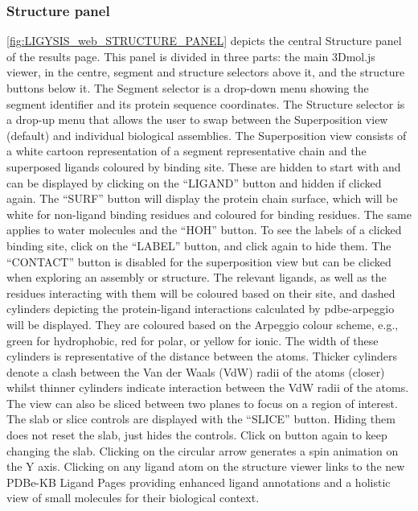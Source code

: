 \subsubsection{Structure panel}

\autoref{fig:LIGYSIS_web_STRUCTURE_PANEL} depicts the central Structure panel of the results page. This panel is divided in three parts: the main 3Dmol.js viewer, in the centre, segment and structure selectors above it, and the structure buttons below it. The Segment selector  is a drop-down menu showing the segment identifier and its protein sequence coordinates. The Structure selector is a drop-up menu that allows the user to swap between the Superposition view (default) and individual biological assemblies. The Superposition view consists of a white cartoon representation of a segment representative chain and the superposed ligands coloured by binding site. These are hidden to start with and can be displayed by clicking on the ``LIGAND'' button and hidden if clicked again. The ``SURF'' button will display the protein chain surface, which will be white for non-ligand binding residues and coloured for binding residues. The same applies to water molecules and the ``HOH'' button. To see the labels of a clicked binding site, click on the ``LABEL'' button, and click again to hide them. The ``CONTACT'' button is disabled for the superposition view but can be clicked when exploring an assembly or structure. The relevant ligands, as well as the residues interacting with them will be coloured based on their site, and dashed cylinders depicting the protein-ligand interactions calculated by pdbe-arpeggio will be displayed. They are coloured based on the Arpeggio colour scheme, e.g., green for hydrophobic, red for polar, or yellow for ionic. The width of these cylinders is representative of the distance between the atoms. Thicker cylinders denote a clash between the Van der Waals (VdW) radii of the atoms (closer) whilst thinner cylinders indicate interaction between the VdW radii of the atoms. The view can also be sliced between two planes to focus on a region of interest. The slab or slice controls are displayed with the ``SLICE'' button. Hiding them does not reset the slab, just hides the controls. Click on button again to keep changing the slab. Clicking on the circular arrow generates a spin animation on the Y axis. Clicking on any ligand atom on the structure viewer links to the new PDBe-KB Ligand Pages \cite{CHOUDHARY_2024_PDBETOOLS} providing enhanced ligand annotations and a holistic view of small molecules for their biological context.

